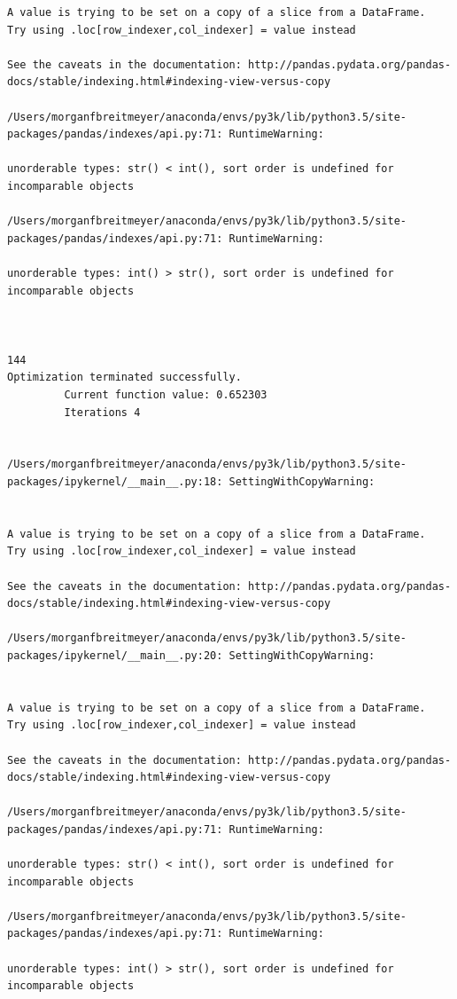 \begin{lstlisting}
A value is trying to be set on a copy of a slice from a DataFrame.
Try using .loc[row_indexer,col_indexer] = value instead

See the caveats in the documentation: http://pandas.pydata.org/pandas-docs/stable/indexing.html#indexing-view-versus-copy

/Users/morganfbreitmeyer/anaconda/envs/py3k/lib/python3.5/site-packages/pandas/indexes/api.py:71: RuntimeWarning:

unorderable types: str() < int(), sort order is undefined for incomparable objects

/Users/morganfbreitmeyer/anaconda/envs/py3k/lib/python3.5/site-packages/pandas/indexes/api.py:71: RuntimeWarning:

unorderable types: int() > str(), sort order is undefined for incomparable objects



144
Optimization terminated successfully.
         Current function value: 0.652303
         Iterations 4


/Users/morganfbreitmeyer/anaconda/envs/py3k/lib/python3.5/site-packages/ipykernel/__main__.py:18: SettingWithCopyWarning:


A value is trying to be set on a copy of a slice from a DataFrame.
Try using .loc[row_indexer,col_indexer] = value instead

See the caveats in the documentation: http://pandas.pydata.org/pandas-docs/stable/indexing.html#indexing-view-versus-copy

/Users/morganfbreitmeyer/anaconda/envs/py3k/lib/python3.5/site-packages/ipykernel/__main__.py:20: SettingWithCopyWarning:


A value is trying to be set on a copy of a slice from a DataFrame.
Try using .loc[row_indexer,col_indexer] = value instead

See the caveats in the documentation: http://pandas.pydata.org/pandas-docs/stable/indexing.html#indexing-view-versus-copy

/Users/morganfbreitmeyer/anaconda/envs/py3k/lib/python3.5/site-packages/pandas/indexes/api.py:71: RuntimeWarning:

unorderable types: str() < int(), sort order is undefined for incomparable objects

/Users/morganfbreitmeyer/anaconda/envs/py3k/lib/python3.5/site-packages/pandas/indexes/api.py:71: RuntimeWarning:

unorderable types: int() > str(), sort order is undefined for incomparable objects




\end{lstlisting}
